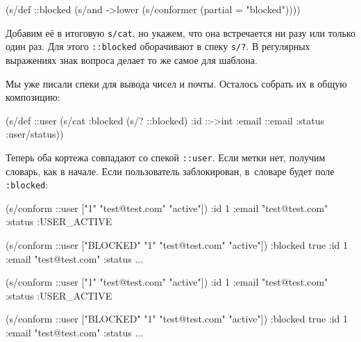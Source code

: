 \begin{english}
  \begin{clojure}
(s/def ::blocked
  (s/and
   ->lower
   (s/conformer (partial = "blocked"))))
  \end{clojure}
\end{english}


Добавим её в итоговую \verb|s/cat|, но укажем, что она встречается ни разу
или только один раз. Для этого \verb|::blocked| оборачивают в спеку
\verb|s/?|.  В регулярных выражениях знак вопроса делает то же самое для
шаблона.

Мы уже писали спеки для вывода чисел и почты. Осталось собрать их в общую
композицию:

\begin{english}
  \begin{clojure}
(s/def ::user
  (s/cat :blocked (s/? ::blocked)
         :id ::->int
         :email ::email
         :status :user/status))
  \end{clojure}
\end{english}

Теперь оба кортежа совпадают со спекой \verb|::user|. Если метки нет, получим
словарь, как в начале. Если пользователь заблокирован, в~словаре будет поле
\verb|:blocked|:

\ifx\DEVICETYPE\MOBILE

\begin{english}
  \begin{clojure}
(s/conform ::user
  ["1" "test@test.com" "active"])
{:id 1
 :email "test@test.com"
 :status :USER_ACTIVE}

(s/conform ::user
  ["BLOCKED" "1"
   "test@test.com" "active"])
{:blocked true
 :id 1
 :email "test@test.com"
 :status ...}
  \end{clojure}
\end{english}

\else

\begin{english}
  \begin{clojure}
(s/conform ::user ["1" "test@test.com" "active"])
{:id 1 :email "test@test.com" :status :USER_ACTIVE}

(s/conform ::user ["BLOCKED" "1" "test@test.com" "active"])
{:blocked true :id 1 :email "test@test.com" :status ...}
  \end{clojure}
\end{english}

\fi

